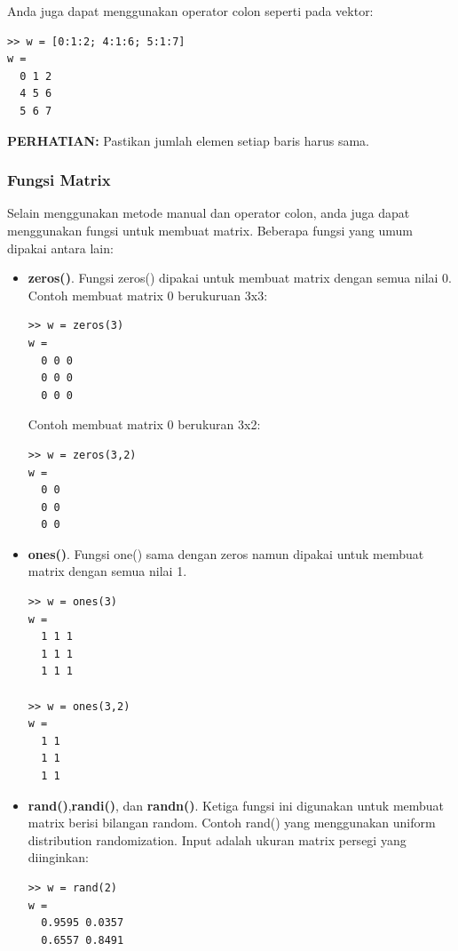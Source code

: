 \documentclass[12pt]{book}
\begin{document}
	Anda juga dapat menggunakan operator colon seperti pada vektor:
	\begin{verbatim}
>> w = [0:1:2; 4:1:6; 5:1:7]
w = 
  0 1 2
  4 5 6 
  5 6 7
	\end{verbatim}

	\textbf{PERHATIAN:} Pastikan jumlah elemen setiap baris harus sama.
	
	\subsubsection{Fungsi Matrix}
	
	Selain menggunakan metode manual dan operator colon, anda juga dapat menggunakan fungsi untuk membuat matrix.
	Beberapa fungsi yang umum dipakai antara lain:
	\begin{itemize}
		\item \textbf{zeros()}. Fungsi zeros() dipakai untuk membuat matrix dengan semua nilai 0.
		Contoh membuat matrix 0 berukuruan 3x3:
		\begin{verbatim}
>> w = zeros(3)
w = 
  0 0 0
  0 0 0
  0 0 0
		\end{verbatim}
	
		Contoh membuat matrix 0 berukuran 3x2:
		\begin{verbatim}
>> w = zeros(3,2)
w = 
  0 0
  0 0
  0 0
		\end{verbatim}
	
		\item \textbf{ones()}. Fungsi one() sama dengan zeros namun dipakai untuk membuat matrix dengan semua nilai 1.
		\begin{verbatim}
>> w = ones(3)
w = 
  1 1 1
  1 1 1
  1 1 1
  
>> w = ones(3,2)
w =
  1 1
  1 1
  1 1
		\end{verbatim}
	
		\item \textbf{rand()},\textbf{randi()}, dan \textbf{randn()}. Ketiga fungsi ini digunakan untuk membuat matrix berisi bilangan random.
		Contoh rand() yang menggunakan uniform distribution randomization. Input adalah ukuran matrix persegi yang diinginkan:
		\begin{verbatim}
>> w = rand(2)
w =
  0.9595 0.0357
  0.6557 0.8491
		\end{verbatim}
	

\end{itemize}
\end{document}
